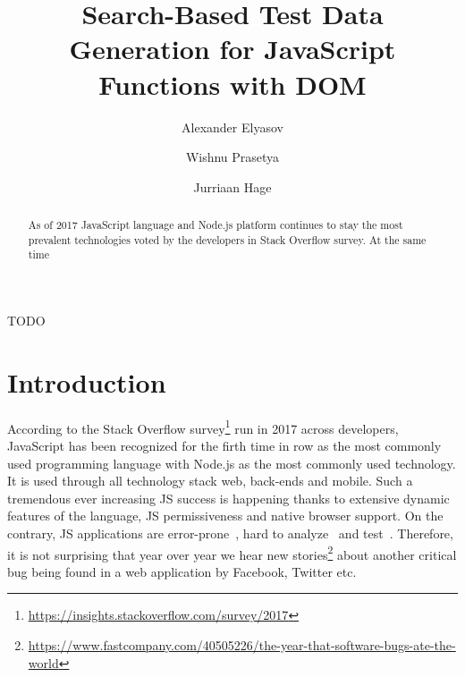 \documentclass[sigconf,review, anonymous]{acmart}
\begin{document}
\title{Search-Based Test Data Generation for JavaScript Functions with DOM}



\author{Alexander Elyasov}

\author{Wishnu Prasetya}

\author{Jurriaan Hage}


\begin{abstract}
As of 2017 JavaScript language and Node.js platform continues to stay the most prevalent technologies voted by the developers in Stack Overflow survey. At the same time  
\end{abstract}

%
%
\begin{CCSXML}
TODO 
\end{CCSXML}





\maketitle


\section{Introduction}
\label{sec.intro}

According to the Stack Overflow survey\footnote{\url{https://insights.stackoverflow.com/survey/2017}} run in 2017 across developers, JavaScript has been recognized for the firth time in row as the most commonly used programming language with Node.js as the most commonly used technology. It is used through all technology stack web, back-ends and mobile. Such a tremendous ever increasing JS success is happening thanks to extensive dynamic features of the language, JS permissiveness and native browser support. On the contrary, JS applications are error-prone~\cite{why}, hard to analyze~\cite{why} and test~\cite{why}. Therefore, it is not surprising that year over year we hear new stories\footnote{\url{https://www.fastcompany.com/40505226/the-year-that-software-bugs-ate-the-world}} about another critical bug being found in a web application by Facebook, Twitter etc. 
\end{document}

